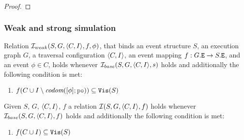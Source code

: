 \documentclass[12pt]{article}
\begin{document}
\begin{proof}






    
\end{proof}

\subsubsection{Weak and strong simulation}

\begin{definition}
  Relation $\mathcal{I}_{weak}(S, G, \langle C, I \rangle, f, \phi)$, that binds an 
  event structure $S$, an \imm execution graph $G$,
  a traversal configuration $\langle C, I \rangle$,
  an event mapping $f : G.{\mathtt{E}} \rightarrow S.{\mathtt{E}}$,
  and an event $\phi \in C$,
  holds whenever $\mathcal{I}_{base}(S, G, \langle C, I \rangle, s)$ holds and
  additionally the following condition is met:
  \begin{enumerate}[label=\textbf{S$_{weak}$.\arabic*},start=8]
     
    \item \label{item:sim-vis-weak}
      $f(C \cup I \setminus \codom{[\phi];\lPO}) \subseteq \lVIS(S)$

  \end{enumerate}
\end{definition}

\begin{definition}
  Given $S$, $G$, $\langle C, I \rangle$, $f$ a relation $\mathcal{I}(S, G, \langle C, I \rangle, f)$ holds
  whenever $\mathcal{I}_{base}(S, G, \langle C, I \rangle, f)$ holds and additionally
  the following condition is met:
  \begin{enumerate}[label=\textbf{S.\arabic*},start=8]
    \item \label{item:sim-vis}
       $f(C \cup I) \subseteq {\mathtt{Vis}}(S)$
  \end{enumerate}
\end{definition}
\end{document}
